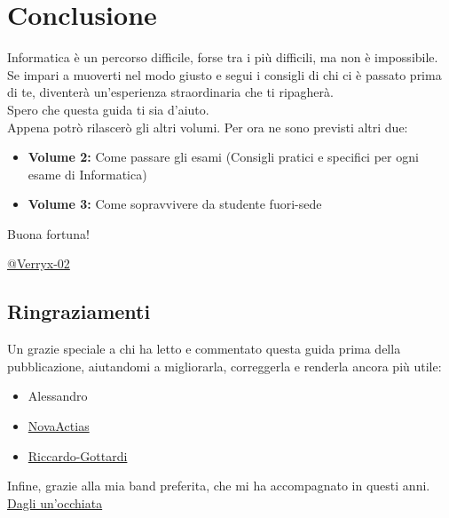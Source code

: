 \documentclass{article}
\begin{document}
\section{Conclusione}
Informatica è un percorso difficile, forse tra i più difficili, ma non è impossibile.\\
Se impari a muoverti nel modo giusto e segui i consigli di chi ci è passato prima di te, diventerà un'esperienza straordinaria che ti ripagherà.\\
Spero che questa guida ti sia d'aiuto.\\
Appena potrò rilascerò gli altri volumi. Per ora ne sono previsti altri due:
\begin{itemize}
\item \textbf{Volume 2:} Come passare gli esami (Consigli pratici e specifici per ogni esame di Informatica)
\item \textbf{Volume 3:} Come sopravvivere da studente fuori-sede
\end{itemize}

Buona fortuna!

\vspace{1cm}
\begin{flushright}
\href{https://github.com/Verryx-02}{@Verryx-02}
\end{flushright}

\subsection*{Ringraziamenti}
Un grazie speciale a chi ha letto e commentato questa guida prima della pubblicazione, aiutandomi a migliorarla, correggerla e renderla ancora più utile:
\begin{itemize}
\item Alessandro
\item \href{https://github.com/NovaActias}{NovaActias}
\item \href{https://github.com/Riccardo-Gottardi}{Riccardo-Gottardi}

\end{itemize}%
Infine, grazie alla mia band preferita, che mi ha accompagnato in questi anni. \href{https://www.youtube.com/watch?v=0dG9pXeOgT0}{Dagli un'occhiata}
\end{document}
